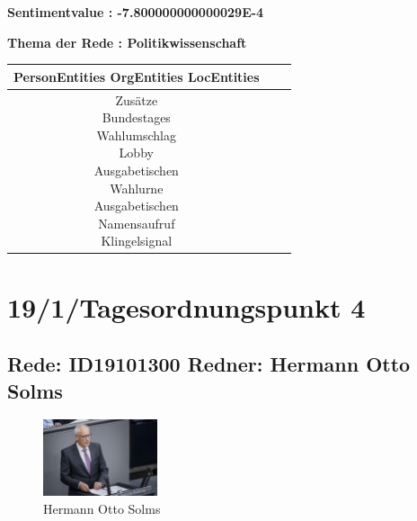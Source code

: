 \documentclass[a4paper,11pt]{article}
\begin{document}
\textbf{Sentimentvalue : -7.800000000000029E-4}

\textbf{Thema der Rede : Politikwissenschaft}
\vspace*{1cm}

\begin{table}[ht]
\centering
\begin{tabular}{||c | c | c||}
\hline
PersonEntities  OrgEntities  LocEntities \\ 

\hline\hline
\makecell{Zusätze \\
} 
\makecell{Bundestages \\
Wahlumschlag \\
} 
\makecell{Lobby \\
Ausgabetischen \\
Wahlurne \\
Ausgabetischen \\
Namensaufruf \\
Klingelsignal \\
}\\
\hline
\end{tabular}
\end{table}
\clearpage


\section{19/1/Tagesordnungspunkt 4} 

\subsection{Rede: ID19101300  Redner: Hermann Otto Solms}

\begin{figure}[ht]

\centering

\includegraphics[width=0.3\textwidth]{Hermann_Otto_Solms.jpg}

\caption{Hermann Otto Solms}

\end{figure}
\end{document}
